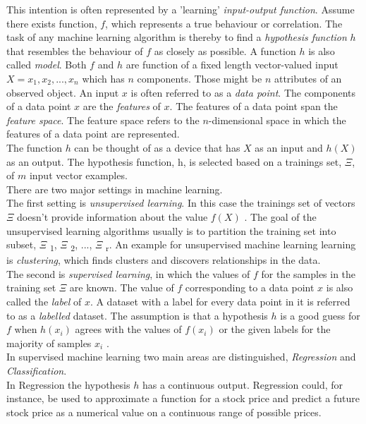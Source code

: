 This intention is often represented by a 'learning' \emph{input-output function}. Assume there exists function, $f$, which represents a true behaviour or correlation. The task of any machine learning algorithm is thereby to find a \emph{hypothesis function} $h$ that resembles the behaviour of $f$ as closely as possible. A function $h$ is also called \emph{model}. Both $f$ and $h$ are function of a fixed length vector-valued input $X={x_1, x_2, ... , x_n}$ which has $n$ components. Those might be $n$ attributes of an observed object. An input $x$ is often referred to as a \emph{data point}. The components of a data point $x$ are the \emph{features} of $x$. 
The features of a data point span the \emph{feature space}. The feature space refers to the $n$-dimensional space in which the features of a data point are represented.
\\
The function $h$ can be thought of as a device that has $X$ as an input and $h(X)$ as an output. The hypothesis function, h, is selected based on a trainings set, $\Xi$, of $m$ input vector examples.
\\
There are two major settings in machine learning. 
\\
The first setting is \emph{unsupervised learning}. In this case the trainings set of vectors $\Xi$ doesn't provide information about the value $f(X)$ . The goal of the unsupervised learning algorithms usually is to partition the training set into subset, $\Xi$ \textsubscript{1}, $\Xi$ \textsubscript{2}, ..., $\Xi$ \textsubscript{r}. An example for unsupervised machine learning learning is \emph{clustering}, which finds clusters and discovers relationships in the data.
\\
The second is  \emph{supervised learning}, in which the values of $f$ for the samples in the training set $\Xi$ are known. The value of $f$ corresponding to a data point $x$ is also called the \emph{label} of $x$. A dataset with a label for every data point in it is referred to as a \emph{labelled} dataset. The assumption is that a hypothesis $h$ is a good guess for $f$ when $h(x_i)$ agrees with the values of $f(x_i)$ or the given labels for the majority of samples $x_i$ .
\\
In supervised machine learning two main areas are distinguished, \emph{Regression} and \emph{Classification}. 
\\
In Regression the hypothesis $h$ has a continuous output. Regression could, for instance, be used to approximate a function for a stock price and predict a future stock price as a numerical value on a continuous range of possible prices.
